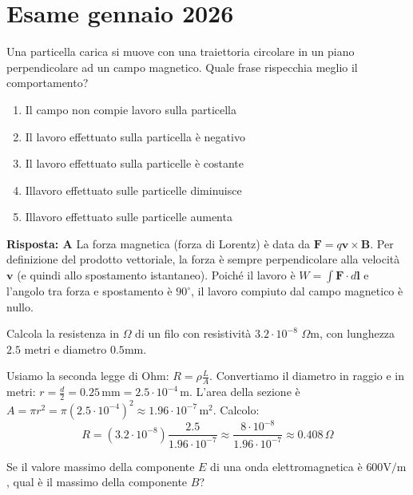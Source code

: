 \documentclass[a4paper]{article}
\begin{document}
\section{Esame gennaio 2026}
\begin{snippetexercise}{}
    Una particella carica si muove con una traiettoria circolare
    in un piano perpendicolare ad un campo magnetico. Quale frase rispecchia meglio il comportamento?
    \begin{enumerate}[label=\Alph*, nosep]
        \item Il campo non compie lavoro sulla particella
        \item Il lavoro effettuato sulla particella è negativo
        \item Il lavoro effettuato sulla particelle è costante
        \item Illavoro effettuato sulle particelle diminuisce
        \item Illavoro effettuato sulle particelle aumenta
    \end{enumerate}
\end{snippetexercise}
\begin{snippetsolution}{}
    \textbf{Risposta: A}
    La forza magnetica (forza di Lorentz) è data da \(\mathbf{F} = q\mathbf{v} \times \mathbf{B}\). Per definizione del prodotto vettoriale, la forza è sempre perpendicolare alla velocità \(\mathbf{v}\) (e quindi allo spostamento istantaneo). Poiché il lavoro è \(W = \int \mathbf{F} \cdot d\mathbf{l}\) e l'angolo tra forza e spostamento è \(90^\circ\), il lavoro compiuto dal campo magnetico è nullo.
\end{snippetsolution}
\begin{snippetexercise}{}
    Calcola la resistenza in \(\Omega\) di un filo con resistività \(3.2 \cdot 10^{-8}\)
    \(\Omega \text{m}\), con lunghezza \(2.5\) metri e diametro \(0.5 \text{mm}\).
\end{snippetexercise}
\begin{snippetsolution}{}
    Usiamo la seconda legge di Ohm: \(R = \rho \frac{L}{A}\).
    Convertiamo il diametro in raggio e in metri: \(r = \frac{d}{2} = 0.25 \, \text{mm} = 2.5 \cdot 10^{-4} \, \text{m}\).
    L'area della sezione è \(A = \pi r^2 = \pi (2.5 \cdot 10^{-4})^2 \approx 1.96 \cdot 10^{-7} \, \text{m}^2\).
    Calcolo:
    \[
    R = (3.2 \cdot 10^{-8}) \frac{2.5}{1.96 \cdot 10^{-7}} \approx \frac{8 \cdot 10^{-8}}{1.96 \cdot 10^{-7}} \approx 0.408 \, \Omega
    \]
\end{snippetsolution}
\begin{snippetexercise}{}
    Se il valore massimo della componente \(E\) di una onda elettromagnetica è \(600 \text{V/m}\), qual è il massimo della componente \(B\)?
\end{snippetexercise}
\end{document}
